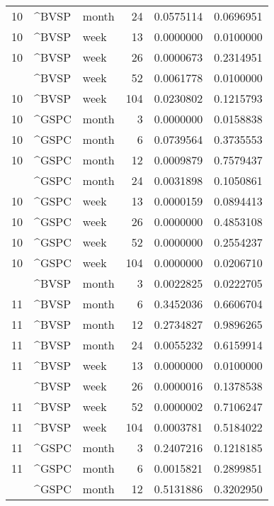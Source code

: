 \begin{tabular}{rllrrr}
10 & \textasciicircum{}BVSP & month & 24 & 0.0575114 & 0.0696951\\
10 & \textasciicircum{}BVSP & week & 13 & 0.0000000 & 0.0100000\\
10 & \textasciicircum{}BVSP & week & 26 & 0.0000673 & 0.2314951\\
\addlinespace
10 & \textasciicircum{}BVSP & week & 52 & 0.0061778 & 0.0100000\\
10 & \textasciicircum{}BVSP & week & 104 & 0.0230802 & 0.1215793\\
10 & \textasciicircum{}GSPC & month & 3 & 0.0000000 & 0.0158838\\
10 & \textasciicircum{}GSPC & month & 6 & 0.0739564 & 0.3735553\\
10 & \textasciicircum{}GSPC & month & 12 & 0.0009879 & 0.7579437\\
\addlinespace
10 & \textasciicircum{}GSPC & month & 24 & 0.0031898 & 0.1050861\\
10 & \textasciicircum{}GSPC & week & 13 & 0.0000159 & 0.0894413\\
10 & \textasciicircum{}GSPC & week & 26 & 0.0000000 & 0.4853108\\
10 & \textasciicircum{}GSPC & week & 52 & 0.0000000 & 0.2554237\\
10 & \textasciicircum{}GSPC & week & 104 & 0.0000000 & 0.0206710\\
\addlinespace
11 & \textasciicircum{}BVSP & month & 3 & 0.0022825 & 0.0222705\\
11 & \textasciicircum{}BVSP & month & 6 & 0.3452036 & 0.6606704\\
11 & \textasciicircum{}BVSP & month & 12 & 0.2734827 & 0.9896265\\
11 & \textasciicircum{}BVSP & month & 24 & 0.0055232 & 0.6159914\\
11 & \textasciicircum{}BVSP & week & 13 & 0.0000000 & 0.0100000\\
\addlinespace
11 & \textasciicircum{}BVSP & week & 26 & 0.0000016 & 0.1378538\\
11 & \textasciicircum{}BVSP & week & 52 & 0.0000002 & 0.7106247\\
11 & \textasciicircum{}BVSP & week & 104 & 0.0003781 & 0.5184022\\
11 & \textasciicircum{}GSPC & month & 3 & 0.2407216 & 0.1218185\\
11 & \textasciicircum{}GSPC & month & 6 & 0.0015821 & 0.2899851\\
\addlinespace
11 & \textasciicircum{}GSPC & month & 12 & 0.5131886 & 0.3202950\\

\end{tabular}
